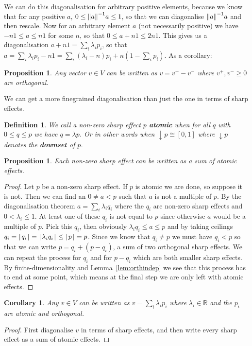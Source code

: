 \documentclass[b5paper,onecolumn,12pt,accepted=2019-05-03, issue=1, volume=1, shorttitle=papers/compositionality-1-1]{compositionalityarticle}
\DeclarePairedDelimiter{\ceil}{\lceil}{\rceil}
\newcounter{counter}
\numberwithin{counter}{section}
\newtheorem{proposition}[counter]{Proposition}
\newtheorem{definition}[counter]{Definition}
\newtheorem{corollary}[counter]{Corollary}
\newcommand{\R}{\mathbb{R}}
\begin{document}
We can do this diagonalisation for arbitrary positive elements, because we know that for any positive $a$, $0\leq \norm{a}^{-1}a\leq 1$, so that we can diagonalise $\norm{a}^{-1}a$ and then rescale. Now for an arbitrary element $a$ (not necessarily positive) we have $-n1\leq a \leq n1$ for some $n$, so that $0\leq a+ n1\leq 2n1$. This gives us a diagonalisation $a+n1 = \sum_i\lambda_i p_i$, so that $a = \sum_i\lambda_i p_i - n1 = \sum_i(\lambda_i-n)p_i + n(1-\sum_i p_i)$. As a corollary:
\begin{proposition}
	Any vector $v\in V$ can be written as $v= v^+ - v^-$ where $v^+, v^-\geq 0$ are orthogonal.
\end{proposition}

We can get a more finegrained diagonalisation than just the one in terms of sharp effects.

\begin{definition}
	We call a non-zero sharp effect $p$ \textbf{atomic} when for all $q$ with $0\leq q\leq p$ we have $q=\lambda p$. Or in other words when $\downarrow p \cong [0,1]$ where $\downarrow p$ denotes the \textbf{downset} of $p$.
\end{definition}

\begin{proposition}\label{prop:sharprep}
	Each non-zero sharp effect can be written as a sum of atomic effects.
\end{proposition}
\begin{proof}
	Let $p$ be a non-zero sharp effect. If $p$ is atomic we are done, so suppose it is not. Then we can find an $0\neq a< p$ such that $a$ is not a multiple of $p$. By the diagonalisation theorem $a=\sum_i \lambda_i q_i$ where the $q_i$ are non-zero sharp effects and $0<\lambda_i \leq 1$. At least one of these $q_i$ is not equal to $p$ since otherwise $a$ would be a multiple of $p$. Pick this $q_i$, then obviously $\lambda_i q_i\leq a \leq p$ and by taking ceilings $q_i=\ceil{q_i}=\ceil{\lambda_i q_i}\leq \ceil{p}=p$. Since we know that $q_i\neq p$ we must have $q_i<p$ so that we can write $p=q_i + (p-q_i)$, a sum of two orthogonal sharp effects. We can repeat the process for $q_i$ and for $p-q_i$ which are both smaller sharp effects. By finite-dimensionality and Lemma~\ref{lem:orthindep} we see that this process has to end at some point, which means at the final step we are only left with atomic effects.
\end{proof}

\begin{corollary}\label{cor:atomicspectrum}
    Any $v\in V$ can be written as $v=\sum_i \lambda_i p_i$ where $\lambda_i\in \R$ and the $p_i$ are atomic and orthogonal.
\end{corollary}
\begin{proof}
    First diagonalise $v$ in terms of sharp effects, and then write every sharp effect as a sum of atomic effects.
\end{proof}
\end{document}
